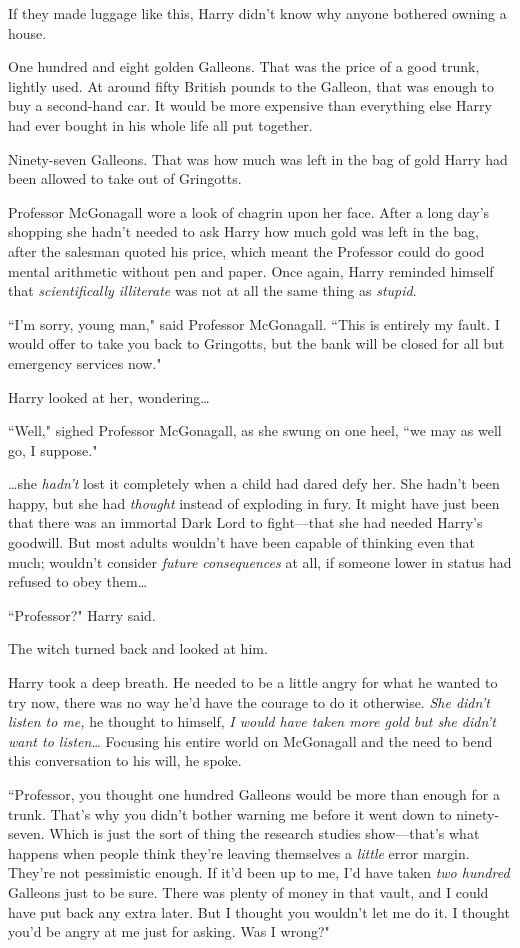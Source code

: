 If they made luggage like this, Harry didn't know why anyone bothered owning a house.

One hundred and eight golden Galleons. That was the price of a good trunk, lightly used. At around fifty British pounds to the Galleon, that was enough to buy a second-hand car. It would be more expensive than everything else Harry had ever bought in his whole life all put together.

Ninety-seven Galleons. That was how much was left in the bag of gold Harry had been allowed to take out of Gringotts.

Professor McGonagall wore a look of chagrin upon her face. After a long day's shopping she hadn't needed to ask Harry how much gold was left in the bag, after the salesman quoted his price, which meant the Professor could do good mental arithmetic without pen and paper. Once again, Harry reminded himself that \emph{scientifically illiterate} was not at all the same thing as \emph{stupid}.

``I'm sorry, young man," said Professor McGonagall. ``This is entirely my fault. I would offer to take you back to Gringotts, but the bank will be closed for all but emergency services now."

Harry looked at her, wondering{\ldots}

``Well," sighed Professor McGonagall, as she swung on one heel, ``we may as well go, I suppose."

{\ldots}she \emph{hadn't} lost it completely when a child had dared defy her. She hadn't been happy, but she had \emph{thought} instead of exploding in fury. It might have just been that there was an immortal Dark Lord to fight—that she had needed Harry's goodwill. But most adults wouldn't have been capable of thinking even that much; wouldn't consider \emph{future consequences} at all, if someone lower in status had refused to obey them{\ldots}

``Professor?" Harry said.

The witch turned back and looked at him.

Harry took a deep breath. He needed to be a little angry for what he wanted to try now, there was no way he'd have the courage to do it otherwise. \emph{She didn't listen to me,} he thought to himself, \emph{I would have taken more gold but she didn't want to listen{\ldots}} Focusing his entire world on McGonagall and the need to bend this conversation to his will, he spoke.

``Professor, you thought one hundred Galleons would be more than enough for a trunk. That's why you didn't bother warning me before it went down to ninety-seven. Which is just the sort of thing the research studies show—that's what happens when people think they're leaving themselves a \emph{little} error margin. They're not pessimistic enough. If it'd been up to me, I'd have taken \emph{two hundred} Galleons just to be sure. There was plenty of money in that vault, and I could have put back any extra later. But I thought you wouldn't let me do it. I thought you'd be angry at me just for asking. Was I wrong?"

